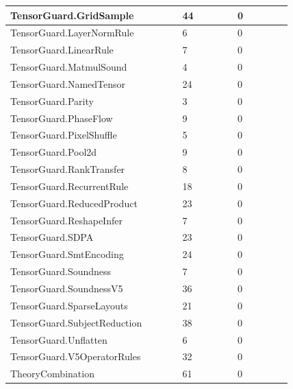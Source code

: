 \documentclass[10pt]{article}
\begin{document}
\begin{longtable}{|p{0.50\linewidth}|p{0.16\linewidth}|p{0.16\linewidth}|}
TensorGuard.GridSample & 44 & 0 \\
\hline
TensorGuard.LayerNormRule & 6 & 0 \\
\hline
TensorGuard.LinearRule & 7 & 0 \\
\hline
TensorGuard.MatmulSound & 4 & 0 \\
\hline
TensorGuard.NamedTensor & 24 & 0 \\
\hline
TensorGuard.Parity & 3 & 0 \\
\hline
TensorGuard.PhaseFlow & 9 & 0 \\
\hline
TensorGuard.PixelShuffle & 5 & 0 \\
\hline
TensorGuard.Pool2d & 9 & 0 \\
\hline
TensorGuard.RankTransfer & 8 & 0 \\
\hline
TensorGuard.RecurrentRule & 18 & 0 \\
\hline
TensorGuard.ReducedProduct & 23 & 0 \\
\hline
TensorGuard.ReshapeInfer & 7 & 0 \\
\hline
TensorGuard.SDPA & 23 & 0 \\
\hline
TensorGuard.SmtEncoding & 24 & 0 \\
\hline
TensorGuard.Soundness & 7 & 0 \\
\hline
TensorGuard.SoundnessV5 & 36 & 0 \\
\hline
TensorGuard.SparseLayouts & 21 & 0 \\
\hline
TensorGuard.SubjectReduction & 38 & 0 \\
\hline
TensorGuard.Unflatten & 6 & 0 \\
\hline
TensorGuard.V5OperatorRules & 32 & 0 \\
\hline
TheoryCombination & 61 & 0 \\
\hline
\end{longtable}
\end{document}
